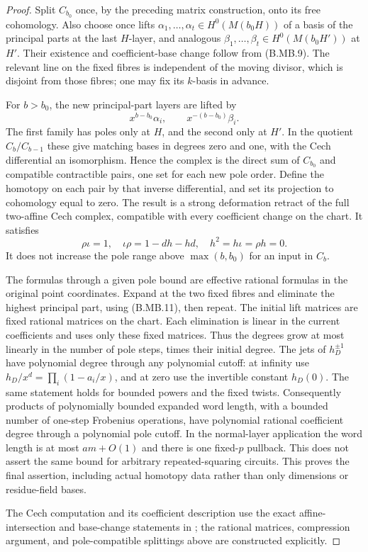 \begin{proof}
Split $C_{b_0}$ once, by the preceding matrix construction,
onto its free cohomology. Also choose once lifts
$\alpha_1,\ldots,\alpha_t\in H^0(M(b_0H))$ of a basis of
the principal parts at the last $H$-layer, and analogous
$\beta_1,\ldots,\beta_t\in H^0(M(b_0H'))$ at $H'$.
Their existence and coefficient-base change follow from
(B.MB.9). The relevant line on the fixed fibres is independent
of the moving divisor, which is disjoint from those fibres;
one may fix its $k$-basis in advance.

For $b>b_0$, the new principal-part layers are lifted by
\[
          x^{b-b_0}\alpha_i,
                         \qquad x^{-(b-b_0)}\beta_i.     \tag{B.MB.11}
\]
The first family has poles only at $H$, and the second only
at $H'$. In the quotient $C_b/C_{b-1}$ these give matching
bases in degrees zero and one, with the Cech differential
an isomorphism. Hence the complex is the direct sum of
$C_{b_0}$ and compatible contractible pairs, one set for
each new pole order. Define the homotopy on each pair by
that inverse differential, and set its projection to
cohomology equal to zero. The result is a strong deformation
retract of the full two-affine Cech complex, compatible with
every coefficient change on the chart. It satisfies
\[
 \rho\iota=1,\quad \iota\rho=1-dh-hd,\quad
                 h^2=h\iota=\rho h=0.                   \tag{B.MB.12}
\]
It does not increase the pole range above
$\max(b,b_0)$ for an input in $C_b$.

The formulas through a given pole bound are effective rational
formulas in the original point coordinates. Expand at the
two fixed fibres and eliminate the highest principal part,
using (B.MB.11), then repeat. The initial lift matrices are
fixed rational matrices on the chart. Each elimination is
linear in the current coefficients and uses only these fixed
matrices. Thus the degrees grow at most linearly in the
number of pole steps, times their initial degree. The jets
of $h_D^{\pm1}$ have polynomial degree through any polynomial
cutoff: at infinity use
$h_D/x^d=\prod_i(1-a_i/x)$, and at zero use the invertible
constant $h_D(0)$. The same statement holds for bounded powers
and the fixed twists. Consequently products of polynomially
bounded expanded word length, with a bounded number of one-step
Frobenius operations, have polynomial rational coefficient degree
through a polynomial pole cutoff. In the normal-layer application
the word length is at most $am+O(1)$ and there is one fixed-$p$
pullback. This does not assert the same bound for arbitrary
repeated-squaring circuits.
This proves the final assertion, including actual homotopy
data rather than only dimensions or residue-field bases.

The Cech computation and its coefficient description use
the exact affine-intersection and base-change statements in
\citep[Tags 0BDX, 01XD, 02KE]{C_StacksFiniteCechHom}; the
rational matrices, compression argument, and pole-compatible
splittings above are constructed explicitly.
\end{proof}


